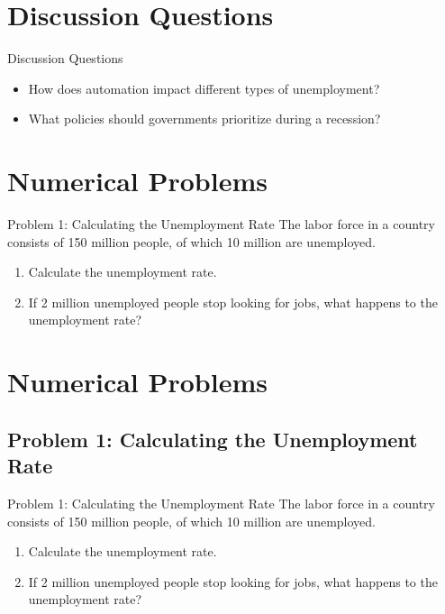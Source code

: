\documentclass{beamer}
\begin{document}
\section{Discussion Questions}
\begin{frame}{Discussion Questions}
    \begin{itemize}
        \item How does automation impact different types of unemployment?
        \item What policies should governments prioritize during a recession?
      
    \end{itemize}
\end{frame}


\section{Numerical Problems}

\begin{frame}{Problem 1: Calculating the Unemployment Rate}
The labor force in a country consists of 150 million people, of which 10 million are unemployed.
\begin{enumerate}
    \item Calculate the unemployment rate.  
    \item If 2 million unemployed people stop looking for jobs, what happens to the unemployment rate?  
\end{enumerate}
\end{frame}



\section{Numerical Problems}

\subsection{Problem 1: Calculating the Unemployment Rate}
\begin{frame}{Problem 1: Calculating the Unemployment Rate}
The labor force in a country consists of 150 million people, of which 10 million are unemployed.
\begin{enumerate}
    \item Calculate the unemployment rate.  
    \item If 2 million unemployed people stop looking for jobs, what happens to the unemployment rate?  
\end{enumerate}
\end{frame}
\end{document}
